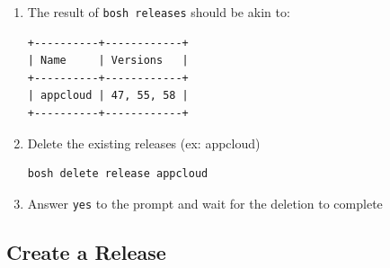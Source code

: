 \begin{enumerate}
\item The result of \texttt{bosh releases} should be akin to:

\begin{verbatim}
+----------+------------+
| Name     | Versions   |
+----------+------------+
| appcloud | 47, 55, 58 |
+----------+------------+
\end{verbatim}


\item Delete the existing releases (ex: appcloud) 

\begin{verbatim}
bosh delete release appcloud
\end{verbatim}


\item Answer \texttt{yes} to the prompt and wait for the deletion to complete

\end{enumerate}

\subsection{Create a Release}
\label{createarelease}

